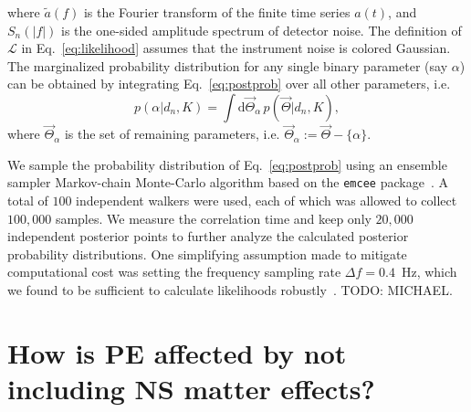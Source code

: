\documentclass[aps,prd,amsmath,floats,floatfix, twocolumn,
superscriptaddress,nofootinbib,showpacs]{revtex4-1}
\newcommand{\prayush}{\textcolor{red!40!black}}
\newcommand{\D}{\mathrm{d}}
\newcommand{\LL}{\mathcal{L}}
\begin{document}
% 
where $\tilde{a}(f)$ is the Fourier transform of the finite time series $a(t)$,
and $S_n(|f|)$ is the one-sided amplitude spectrum of detector noise. The 
definition of $\LL$ in Eq.~\ref{eq:likelihood} assumes that the instrument
noise is colored Gaussian. The marginalized probability distribution for any
single binary parameter (say $\alpha$) can be obtained by integrating
Eq.~\ref{eq:postprob} over all other parameters, i.e. 
\begin{equation}
 p(\alpha | d_n, K) = \int\D \vec{\Theta}_\alpha\, p(\vec{\Theta} | d_n, K),
\end{equation}
where $\vec{\Theta}_\alpha$ is the set of remaining parameters, i.e.
$\vec{\Theta}_\alpha:=\vec{\Theta} - \{\alpha\}$.



We sample the probability distribution of Eq.~\ref{eq:postprob} using
an ensemble sampler Markov-chain Monte-Carlo algorithm based on the {\tt emcee}
package~. A total of $100$ independent walkers were used, each of which
was allowed to collect $100,000$ samples. We measure the correlation time and keep
only $20,000$ independent posterior points to further analyze the calculated 
posterior probability distributions. One simplifying assumption made to mitigate 
computational cost was setting the frequency sampling rate $\Delta f=0.4$~Hz, which
we found to be sufficient to calculate likelihoods robustly~\cite{Purrer:2015nkh}.
\prayush{TODO: MICHAEL}.




\section{How is PE affected by not including NS matter effects?}\label{s1:PEwithnoNS}
\end{document}
